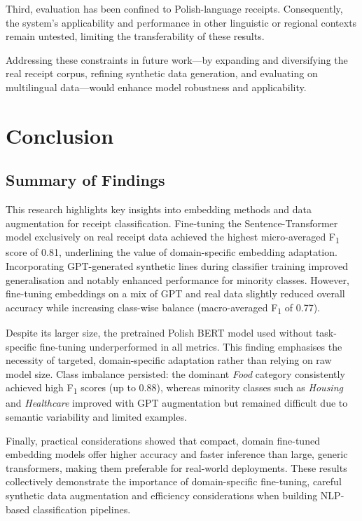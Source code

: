 \documentclass{SGGW-thesis-EN}
\begin{document}
Third, evaluation has been confined to Polish-language receipts. Consequently, the system’s applicability and
performance in other linguistic or regional contexts remain untested, limiting the transferability of these results.

Addressing these constraints in future work—by expanding and diversifying the real receipt corpus, refining
synthetic data generation, and evaluating on multilingual data—would enhance model robustness and applicability.


\chapter{Conclusion}

\section{Summary of Findings}
This research highlights key insights into embedding methods and data augmentation for receipt classification.
Fine-tuning the Sentence-Transformer model exclusively on real receipt data achieved
the highest micro-averaged F\textsubscript{1} score of 0.81, underlining the value of domain-specific embedding
adaptation. Incorporating GPT-generated synthetic lines during classifier training improved generalisation and
notably enhanced performance for minority classes. However, fine-tuning embeddings on a mix of GPT and real data
slightly reduced overall accuracy while increasing class-wise balance (macro-averaged F\textsubscript{1} of 0.77).

Despite its larger size, the pretrained Polish BERT model used
without task-specific fine-tuning underperformed in all metrics. This finding emphasises the necessity of targeted,
domain-specific adaptation rather than relying on raw model size. Class imbalance persisted: the dominant
\emph{Food} category consistently achieved high F\textsubscript{1} scores (up to 0.88), whereas minority classes
such as \emph{Housing} and \emph{Healthcare} improved with GPT augmentation but remained difficult due to semantic
variability and limited examples.

Finally, practical considerations showed that compact, domain fine-tuned embedding models offer higher accuracy
and faster inference than large, generic transformers, making them preferable for real-world deployments. These
results collectively demonstrate the importance of domain-specific fine-tuning, careful synthetic data augmentation
and efficiency considerations when building NLP-based classification pipelines.
\end{document}
